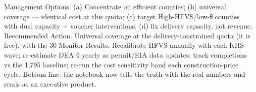 Management Options. (a) Concentrate on efficient counties; (b) universal coverage — identical cost at this quota; (c) target High-HFVS/low-θ counties with dual capacity + voucher interventions; (d) fix delivery capacity, not revenue.
Recommended Action. Universal coverage at the delivery-constrained quota (it is free), with the 30%
Monitor Results. Recalibrate HFVS annually with each KHS wave; re-estimate DEA θ yearly as permit/EIA data updates; track completions vs the 1,795 baseline; re-run the cost sensitivity band each construction-price cycle.
Bottom line: the notebook now tells the truth with the real numbers and reads as an executive product. 